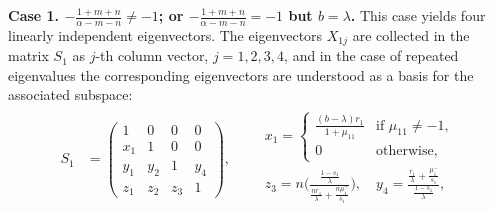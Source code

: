 \documentclass[11pt]{article}
\theoremstyle{remark}
\begin{document}
{\bf Case 1. $-\frac{1+m+n}{\alpha-m-n}\ne -1$; or $-\frac{1+m+n}{\alpha-m-n}= -1$ but $b=\lambda$. } This case yields four linearly independent eigenvectors. The eigenvectors $X_{1j}$ are collected in the matrix $S_1$ as $j$-th column vector, $j=1,2,3,4$, and in the case of repeated eigenvalues
the corresponding eigenvectors are understood as a basis for the associated subspace:
\begin{align*}
 S_1&=
 \begin{pmatrix}
    1 & 0 & 0 & 0\\
    x_1 & 1 & 0 & 0\\
    y_1 & y_2 & 1 & y_4\\
    z_1 & z_2 & z_3 &1
 \end{pmatrix}, \quad \quad
 \begin{array}{l}
  x_1=
 \begin{cases}
  \frac{(b-\lambda)r_1}{1+\mu_{11}} & \text{if $\mu_{11}\ne -1$,}\\
  0 & \text{otherwise,}
 \end{cases}\\
 z_3=n\bigg(\frac{\frac{1-s_1}{\lambda}}{\frac{n r_1}{\lambda} + \frac{n\mu_{1}^+}{s_1}}\bigg), \quad y_4=\frac{\frac{r_1}{\lambda}+\frac{\mu_1^-}{s_1}}{\frac{1-s_1}{\lambda}},\\
 \end{array}
\end{align*}
\end{document}
